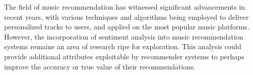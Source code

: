 The field of music recommendation has witnessed significant advancements in recent years, with various techniques and algorithms being employed to deliver personalized tracks to users, and applied on the most popular music platforms. However, the incorporation of sentiment analysis into music recommendation systems remains an area of research ripe for exploration. This analysis could provide additional attributes exploitable by recommender systems to perhaps improve the accuracy or true value of their recommendations.